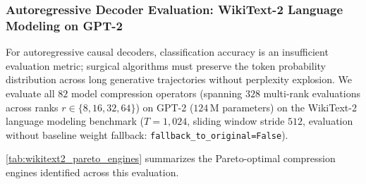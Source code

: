 \subsubsection{Autoregressive Decoder Evaluation: WikiText-2 Language Modeling on GPT-2}
\label{sec:results_gpt2_wikitext}

For autoregressive causal decoders, classification accuracy is an insufficient evaluation metric; surgical algorithms must preserve the token probability distribution across long generative trajectories without perplexity explosion. We evaluate all $82$ model compression operators (spanning $328$ multi-rank evaluations across ranks $r \in \{8, 16, 32, 64\}$) on GPT-2 ($124\,\text{M}$ parameters) on the WikiText-2 language modeling benchmark ($T=1{,}024$, sliding window stride $512$, evaluation without baseline weight fallback: \lstinline{fallback_to_original=False}).

\cref{tab:wikitext2_pareto_engines} summarizes the Pareto-optimal compression engines identified across this evaluation.

